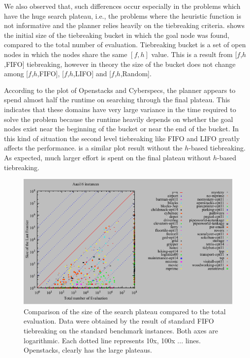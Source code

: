 We also observed that, such differences occur especially in the problems which
have the huge search plateau, i.e., the problems where the heuristic
function is not informative and the planner relies heavily on the
tiebreaking criteria.
% 
 shows the initial size of the
tiebreaking bucket in which the goal node was found, compared to the total number of evaluation.
Tiebreaking bucket is a set of open nodes in which the nodes share
the same $[f,h]$ value.
This is a result from [$f$,$h$,FIFO] tiebreaking, however in theory the size of the bucket
does not change among [$f$,$h$,FIFO], [$f$,$h$,LIFO] and [$f$,$h$,Random].
% 
% 

According to the plot of Openstacks and Cyberspecs, 
the planner appears to spend almost half the runtime on searching through the final
plateau.
This indicates that these domains have very large variance in the time required to solve the problem because the runtime heavily depends on whether the goal nodes exist near the beginning of the bucket or near the end of the bucket.
In this kind of situation the second level tiebreaking like FIFO and LIFO greatly affects the performance.
 is a similar plot result without the $h$-based tiebreaking.
As expected, much larger effort is spent on the final plateau without $h$-based tiebreaking.

\begin{figure}[htbp]
 \centering
 \includegraphics{tables/aaai16-front-vs-evaluated.pdf}
 \caption{Comparison of the size of the search plateau compared to the total evaluation. Data were obtained by the result of standard FIFO tiebreaking on the standard benchmark instances. Both axes are logarithmic. Each dotted line represents 10x, 100x ... lines.  Openstacks,  clearly has the large plateaus.}
 \label{plateau-h}
\end{figure}
% 

